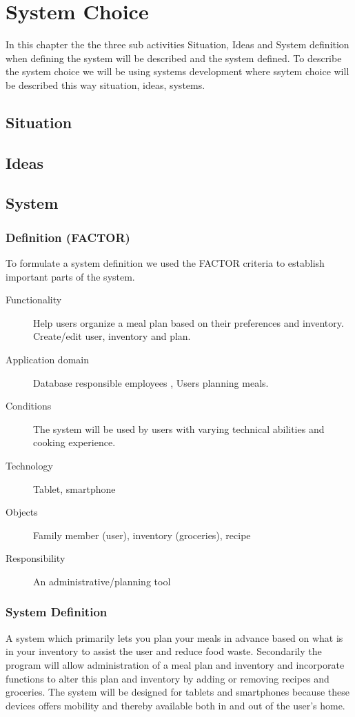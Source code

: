 \chapter{System Choice}
In this chapter the the three sub activities Situation, Ideas and System definition when defining the system will be described and the system defined.
To describe the system choice we will be using systems development where ssytem choice will be described this way situation, ideas, systems.


\section{Situation}


\section{Ideas}


\section{System}
\subsection{Definition (FACTOR)}
To formulate a system definition we used the FACTOR \cite{OOAD_BATOF} criteria to establish important parts of the system.

\begin{description}
	\item[Functionality] Help users organize a meal plan based on their preferences and inventory. Create/edit user, inventory and plan.
	\item[Application domain] Database responsible employees , Users planning meals.
	\item[Conditions] The system will be used by users with varying technical abilities and cooking experience.
	\item[Technology] Tablet, smartphone
	\item[Objects] Family member (user), inventory (groceries), recipe
	\item[Responsibility] An administrative/planning tool
\end{description}

\subsection{System Definition}
A system which primarily lets you plan your meals in advance based on what is in your inventory to assist the user and reduce food waste.
Secondarily the program will allow administration of a meal plan and inventory and incorporate functions to alter this plan and inventory by adding or removing recipes and groceries.
The system will be designed for tablets and smartphones because these devices offers mobility and thereby available both in and out of the user’s home.
